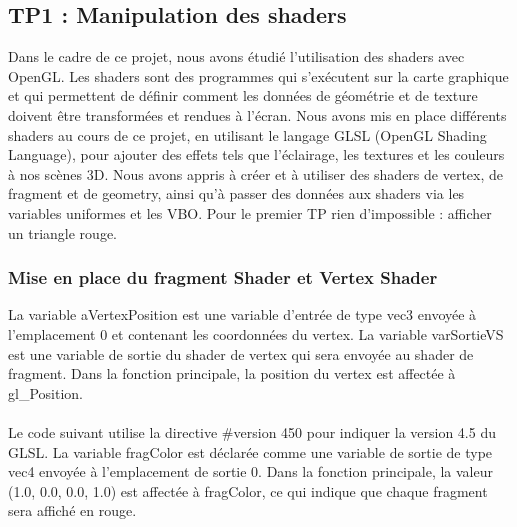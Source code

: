 \documentclass[10pt,a4paper]{article}
\begin{document}
	\subsection{TP1 : Manipulation des shaders} %
		Dans le cadre de ce projet, nous avons étudié l'utilisation des shaders avec OpenGL. Les shaders sont des programmes qui s'exécutent sur la carte graphique et qui permettent de définir comment les données de géométrie et de texture doivent être transformées et rendues à l'écran. Nous avons mis en place différents shaders au cours de ce projet, en utilisant le langage GLSL (OpenGL Shading Language), pour ajouter des effets tels que l'éclairage, les textures et les couleurs à nos scènes 3D. Nous avons appris à créer et à utiliser des shaders de vertex, de fragment et de geometry, ainsi qu'à passer des données aux shaders via les variables uniformes et les VBO. Pour le premier TP rien d'impossible : afficher un triangle rouge. 

		\subsubsection{Mise en place du fragment Shader et Vertex Shader} %
			La variable aVertexPosition est une variable d'entrée de type vec3 envoyée à l'emplacement 0 et contenant les coordonnées du vertex. La variable varSortieVS est une variable de sortie du shader de vertex qui sera envoyée au shader de fragment. Dans la fonction principale, la position du vertex est affectée à gl\_Position.
			
			
			
			\paragraph{} %
				Le code suivant utilise la directive \#version 450 pour indiquer la version 4.5 du GLSL. La variable fragColor est déclarée comme une variable de sortie de type vec4 envoyée à l'emplacement de sortie 0. Dans la fonction principale, la valeur (1.0, 0.0, 0.0, 1.0) est affectée à fragColor, ce qui indique que chaque fragment sera affiché en rouge.
			
			

		
\end{document}
